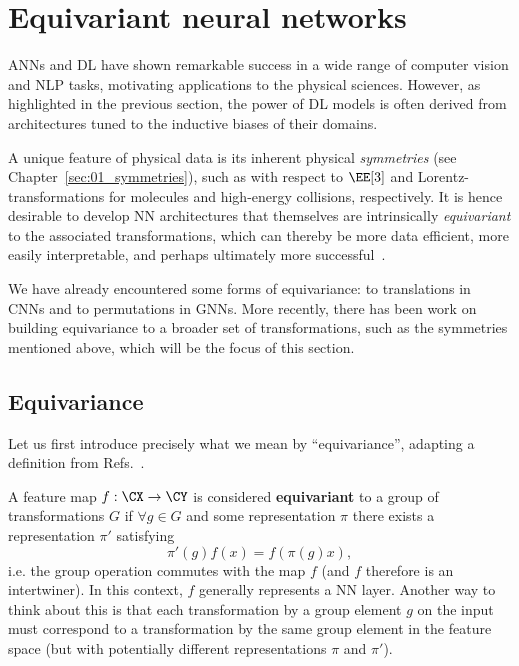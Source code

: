 \section{Equivariant neural networks}
\label{sec:03_ml_equivariantnns}

ANNs and DL have shown remarkable success in a wide range of computer vision and NLP tasks, motivating applications to the physical sciences.
However, as highlighted in the previous section, the power of DL models is often derived from architectures tuned to the inductive biases of their domains.

A unique feature of physical data is its inherent physical \textit{symmetries} (see Chapter~\ref{sec:01_symmetries}), such as with respect to $\EE[3]$ and Lorentz-transformations for molecules and high-energy collisions, respectively.
It is hence desirable to develop NN architectures that themselves are intrinsically \textit{equivariant} to the associated transformations, which can thereby be more data efficient, more easily interpretable, and perhaps ultimately more successful~\cite{thomas2018tensor}.

We have already encountered some forms of equivariance: to translations in CNNs and to permutations in GNNs.
More recently, there has been work on building equivariance to a broader set of transformations, such as the symmetries mentioned above, which will be the focus of this section.

\subsection{Equivariance}
\label{sec:06_equivariantnns_equiv}

Let us first introduce precisely what we mean by ``equivariance'', adapting a definition from Refs.~\cite{cohen2016group, cohen2016steerable, worrall2017harmonic, weiler2019general}.

\begin{definition}
\label{def:06_equivariantnns_equiv}
A feature map $f: \CX \rightarrow \CY$ is considered \textbf{equivariant} to a group of transformations $G$ if $\forall g \in G$ and some representation $\pi$ there exists a representation $\pi'$ satisfying
\begin{equation}\label{eq:06_equivariantnns_equiv}
    \pi'(g)f(x) = f(\pi(g)x),
\end{equation}
i.e. the group operation commutes with the map $f$ (and $f$ therefore is an intertwiner).
In this context, $f$ generally represents a NN layer.
Another way to think about this is that each transformation by a group element $g$ on the input must correspond to a transformation by the same group element in the feature space (but with potentially different representations $\pi$ and $\pi'$).
\end{definition}

